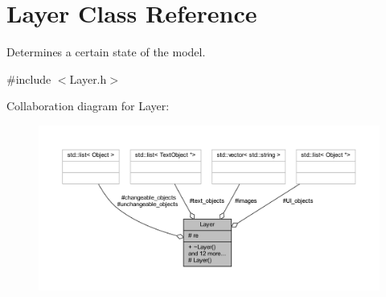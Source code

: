 \hypertarget{class_layer}{}\section{Layer Class Reference}
\label{class_layer}


Determines a certain state of the model.  




{\ttfamily \#include $<$Layer.\+h$>$}



Collaboration diagram for Layer\+:
\nopagebreak
\begin{figure}[H]
\begin{center}
\leavevmode
\includegraphics[width=350pt]{class_layer__coll__graph}
\end{center}
\end{figure}
